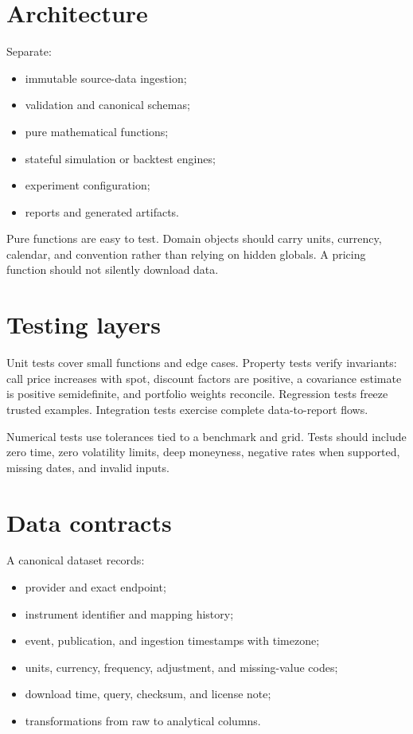 \section{Architecture}

Separate:

\begin{itemize}
\item immutable source-data ingestion;
\item validation and canonical schemas;
\item pure mathematical functions;
\item stateful simulation or backtest engines;
\item experiment configuration;
\item reports and generated artifacts.
\end{itemize}

Pure functions are easy to test. Domain objects should carry units, currency,
calendar, and convention rather than relying on hidden globals. A pricing function
should not silently download data.

\section{Testing layers}

Unit tests cover small functions and edge cases. Property tests verify invariants:
call price increases with spot, discount factors are positive, a covariance estimate
is positive semidefinite, and portfolio weights reconcile. Regression tests freeze
trusted examples. Integration tests exercise complete data-to-report flows.

Numerical tests use tolerances tied to a benchmark and grid. Tests should include
zero time, zero volatility limits, deep moneyness, negative rates when supported,
missing dates, and invalid inputs.

\section{Data contracts}

A canonical dataset records:

\begin{itemize}
\item provider and exact endpoint;
\item instrument identifier and mapping history;
\item event, publication, and ingestion timestamps with timezone;
\item units, currency, frequency, adjustment, and missing-value codes;
\item download time, query, checksum, and license note;
\item transformations from raw to analytical columns.
\end{itemize}

